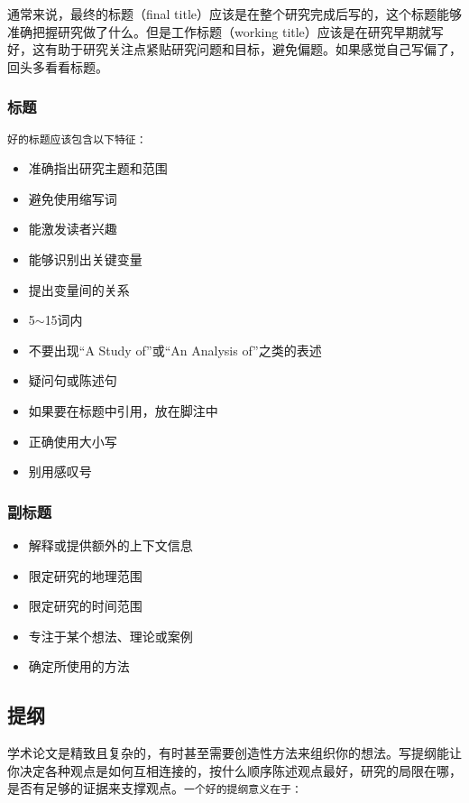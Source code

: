 \documentclass[cn,hazy,blue,14pt,screen]{elegantnote} %
\begin{document}
通常来说，最终的标题（final title）应该是在整个研究完成后写的，这个标题能够准确把握研究做了什么。但是工作标题（working title）应该是在研究早期就写好，这有助于研究关注点紧贴研究问题和目标，避免偏题。如果感觉自己写偏了，回头多看看标题。

\subsubsection{标题}

\lstinline{好的标题应该包含以下特征：}

\begin{itemize}
  \item 准确指出研究主题和范围
  \item 避免使用缩写词
  \item 能激发读者兴趣
  \item 能够识别出关键变量
  \item 提出变量间的关系
  \item 5$\sim$15词内
  \item 不要出现“A Study of”或“An Analysis of”之类的表述
  \item 疑问句或陈述句
  \item 如果要在标题中引用，放在脚注中
  \item 正确使用大小写
  \item 别用感叹号
\end{itemize}

\subsubsection{副标题}

\begin{itemize}
  \item 解释或提供额外的上下文信息
  \item 限定研究的地理范围
  \item 限定研究的时间范围
  \item 专注于某个想法、理论或案例
  \item 确定所使用的方法
\end{itemize}

\subsection{提纲}

学术论文是精致且复杂的，有时甚至需要创造性方法来组织你的想法。写提纲能让你决定各种观点是如何互相连接的，按什么顺序陈述观点最好，研究的局限在哪，是否有足够的证据来支撑观点。\lstinline{一个好的提纲意义在于：}
\end{document}
